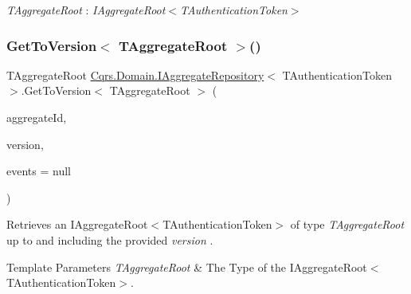 \begin{Desc}
\item[Type Constraints]\begin{description}
\item[{\em T\+Aggregate\+Root} : {\em I\+Aggregate\+Root$<$T\+Authentication\+Token$>$}]\end{description}
\end{Desc}
\mbox{\label{interfaceCqrs_1_1Domain_1_1IAggregateRepository_aa0d6b4b9b117357e1676cae829fe2a5c_aa0d6b4b9b117357e1676cae829fe2a5c}} 
\subsubsection{\texorpdfstring{Get\+To\+Version$<$ T\+Aggregate\+Root $>$()}{GetToVersion< TAggregateRoot >()}}
{\footnotesize\ttfamily T\+Aggregate\+Root \hyperlink{interfaceCqrs_1_1Domain_1_1IAggregateRepository}{Cqrs.\+Domain.\+I\+Aggregate\+Repository}$<$ T\+Authentication\+Token $>$.Get\+To\+Version$<$ T\+Aggregate\+Root $>$ (\begin{DoxyParamCaption}\item[{Guid}]{aggregate\+Id,  }\item[{int}]{version,  }\item[{I\+List$<$ \hyperlink{interfaceCqrs_1_1Events_1_1IEvent}{I\+Event}$<$ T\+Authentication\+Token $>$$>$}]{events = {\ttfamily null} }\end{DoxyParamCaption})}



Retrieves an I\+Aggregate\+Root$<$\+T\+Authentication\+Token$>$ of type {\itshape T\+Aggregate\+Root}  up to and including the provided {\itshape version} . 


\begin{DoxyTemplParams}{Template Parameters}
{\em T\+Aggregate\+Root} & The Type of the I\+Aggregate\+Root$<$\+T\+Authentication\+Token$>$.\\
\hline
\end{DoxyTemplParams}


